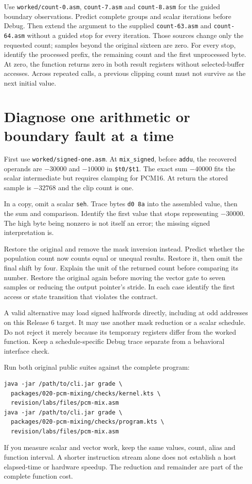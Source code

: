 Use \texttt{worked/count-0.asm}, \texttt{count-7.asm} and
\texttt{count-8.asm} for the guided boundary observations. Predict complete
groups and scalar iterations before Debug. Then extend the argument to the
supplied \texttt{count-63.asm} and \texttt{count-64.asm} without a guided stop
for every iteration. Those sources change only the requested count; samples
beyond the original sixteen are zero. For every stop, identify the processed prefix, the
remaining count and the first unprocessed byte. At zero, the function returns
zero in both result registers without selected-buffer accesses. Across repeated
calls, a previous clipping count must not survive as the next initial value.

\section{Diagnose one arithmetic or boundary fault at a time}

First use \texttt{worked/signed-one.asm}. At \texttt{mix\_signed}, before
\texttt{addu}, the recovered operands are $-30000$ and $-10000$ in
\texttt{\$t0/\$t1}. The exact sum $-40000$ fits the scalar intermediate but
requires clamping for PCM16. At return the stored sample is $-32768$ and the
clip count is one.

In a copy, omit a scalar \texttt{seh}. Trace bytes \texttt{d0 8a} into the
assembled value, then the sum and comparison. Identify the first value that
stops representing $-30000$. The high byte being nonzero is not itself an error;
the missing signed interpretation is.

Restore the original and remove the mask inversion instead. Predict whether the
population count now counts equal or unequal results. Restore it, then omit the
final shift by four. Explain the unit of the returned count before comparing its
number. Restore the original again before moving the vector gate to seven
samples or reducing the output pointer's stride. In each case identify the first
access or state transition that violates the contract.

A valid alternative may load signed halfwords directly, including at odd
addresses on this Release 6 target. It may use another mask reduction or a
scalar schedule. Do not reject it merely because its temporary registers differ
from the worked function. Keep a schedule-specific Debug trace separate from a
behavioral interface check.

Run both original public suites against the complete program:
\begin{verbatim}
java -jar /path/to/cli.jar grade \
  packages/020-pcm-mixing/checks/kernel.kts \
  revision/labs/files/pcm-mix.asm
java -jar /path/to/cli.jar grade \
  packages/020-pcm-mixing/checks/program.kts \
  revision/labs/files/pcm-mix.asm
\end{verbatim}
If you measure scalar and vector work, keep the same values, count, alias and
function interval. A shorter instruction stream alone does not establish a host
elapsed-time or hardware speedup. The reduction and remainder are part of the
complete function cost.

